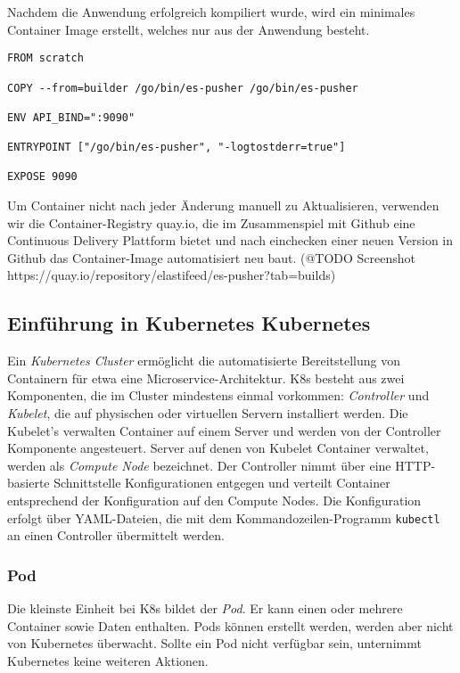 Nachdem die Anwendung erfolgreich kompiliert wurde, wird ein minimales Container Image erstellt, welches nur aus der Anwendung besteht.

\begin{lstlisting}
FROM scratch

COPY --from=builder /go/bin/es-pusher /go/bin/es-pusher

ENV API_BIND=":9090"

ENTRYPOINT ["/go/bin/es-pusher", "-logtostderr=true"]

EXPOSE 9090
\end{lstlisting}

Um Container nicht nach jeder Änderung manuell zu Aktualisieren, verwenden wir die Container-Registry quay.io, die im Zusammenspiel mit Github eine Continuous Delivery Plattform bietet und nach einchecken einer neuen Version in Github das Container-Image automatisiert neu baut. (@TODO Screenshot https://quay.io/repository/elastifeed/es-pusher?tab=builds)

\endsubsubsection
\endsubsection

\subsection{Einführung in Kubernetes Kubernetes}

Ein \textit{Kubernetes Cluster} \cite{k8s} ermöglicht die automatisierte Bereitstellung von Containern für etwa eine Microservice-Architektur.
K8s besteht aus zwei Komponenten, die im Cluster mindestens einmal vorkommen: \textit{Controller} und \textit{Kubelet}, die auf physischen oder virtuellen Servern installiert werden.
Die Kubelet's verwalten Container auf einem Server und werden von der Controller Komponente angesteuert.
Server auf denen von Kubelet Container verwaltet, werden als \textit{Compute Node} bezeichnet.
Der Controller nimmt über eine HTTP-basierte Schnittstelle Konfigurationen entgegen und verteilt Container entsprechend der Konfiguration auf den Compute Nodes.
Die Konfiguration erfolgt über YAML-Dateien, die mit dem Kommandozeilen-Programm \texttt{kubectl} an einen Controller übermittelt werden.

\subsubsection{Pod}
Die kleinste Einheit bei K8s bildet der \textit{Pod}.
Er kann einen oder mehrere Container sowie Daten enthalten.
Pods können erstellt werden, werden aber nicht von Kubernetes überwacht.
Sollte ein Pod nicht verfügbar sein, unternimmt Kubernetes keine weiteren Aktionen.

